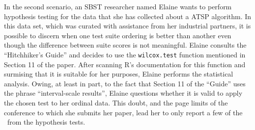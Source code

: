 In the second scenario, an SBST researcher named Elaine wants to perform hypothesis testing for the data that she has
collected about a ATSP algorithm.  In this data set, which was curated with assistance from her industrial partners, it
is possible to discern when one test suite ordering is better than another even though the difference between suite
scores is not meaningful. Elaine consults the ``Hitchhiker's Guide'' and decides to use the {\tt wilcox.test} function
mentioned in Section 11 of the paper. After scanning R's documentation for this function and surmising that it is
suitable for her purposes, Elaine performs the statistical analysis. Owing, at least in part, to the fact that Section
11 of the ``Guide'' uses the phrase ``interval-scale results'', Elaine questions whether it is valid to apply the chosen
test to her ordinal data. This doubt, and the page limits of the conference to which she submits her paper, lead her to
only report a few of the \pvalues~from the hypothesis tests.


